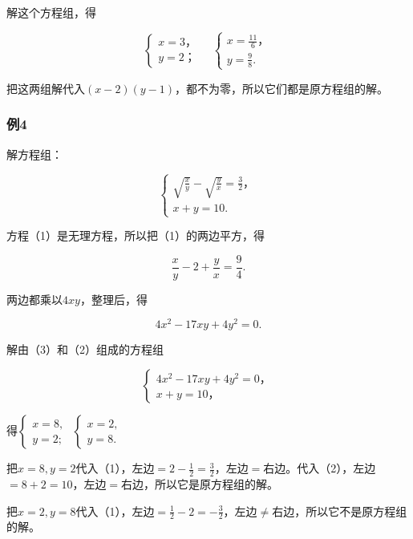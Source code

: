 解这个方程组，得

\[
\left\{ \begin{array}{l} x = 3\text{，} \\ y = 2\text{；} \end{array} \right. \quad \left\{ \begin{array}{l} x = \frac{11}{6}\text{，} \\ y = \frac{9}{8}. \end{array} \right.
\]

把这两组解代入\((x - 2)(y - 1)\)，都不为零，所以它们都是原方程组的解。

\subsubsection{例4}

解方程组：

\[
\left\{ \begin{array}{l} \sqrt {\frac{x}{y}} - \sqrt {\frac{y}{x}} = \frac{3}{2}\text{，} \\ x + y = 10. \end{array} \right. \tag{1}
\]

 方程（1）是无理方程，所以把（1）的两边平方，得

\[
\frac{x}{y} - 2 + \frac{y}{x} = \frac{9}{4}.
\]

两边都乘以\(4xy\)，整理后，得

\[
4 x ^ {2} - 17 x y + 4 y ^ {2} = 0. \tag{3}
\]

解由（3）和（2）组成的方程组

\[
\left\{ \begin{array}{l} 4 x ^ {2} - 17 x y + 4 y ^ {2} = 0\text{，} \\ x + y = 10\text{，} \end{array} \right.
\]

得\(\left\{ \begin{array}{l} x = 8, \\ y = 2; \end{array} \right.\) \(\left\{ \begin{array}{l} x = 2, \\ y = 8. \end{array} \right.\)

把\(x = 8, y = 2\)代入（1），左边\(= 2 - \frac{1}{2} = \frac{3}{2}\)，左边\(=\)右边。代入（2），左边\(= 8 + 2 = 10\)，左边\(=\)右边，所以它是原方程组的解。

把\(x = 2, y = 8\)代入（1），左边\(= \frac{1}{2} - 2 = -\frac{3}{2}\)，左边\(\neq\)右边，所以它不是原方程组的解。

